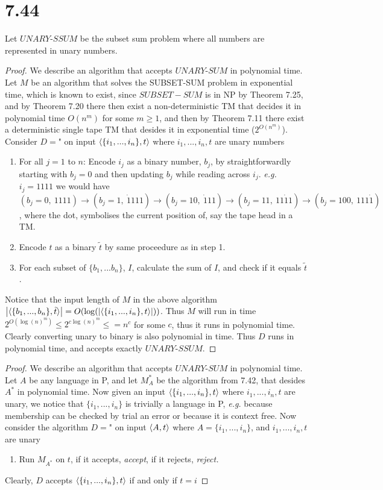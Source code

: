 \documentclass[a4paper,11pt]{article}
\newcommand{\abs}[1]{\left\lvert #1 \right\rvert}
\newcommand{\eg}{\emph{e.g.} }
\numberwithin{equation}{section}
\begin{document}
\section*{7.44}
Let $ UNARY\text{-}SSUM $ be the subset sum problem where all numbers are represented in unary numbers.
\begin{proof}
	We describe an algorithm that accepts $ UNARY\text{-}SUM $ in polynomial time. Let $ M $ be an algorithm that solves the SUBSET-SUM problem in exponential time, which is known to exist, since $ SUBSET-SUM $ is in NP  by Theorem 7.25, and by Theorem 7.20 there then exist a non-deterministic TM that decides it in polynomial time $ O(n^m) $ for some $ m\geq 1 $, and then by Theorem 7.11 there exist a deterministic single tape TM that desides it in exponential time ($ 2^{O(n^m)} $). Consider $ D= $" on input $ \braket{\{i_1,...,i_n\},t} $ where $ i_1,...,i_n,t $ are unary numbers\begin{enumerate}
		\item For all $ j=1 $ to $ n $: Encode $ i_j $ as a binary number, $ b_j $, by straightforwardly starting with $ b_j=0 $ and then updating $ b_j $ while reading across $ i_j $. \eg $ i_j=1111 $ we would have $(b_j=0,\ 1111)\to (b_j=1,\ \dot{1}111)\to (b_j=10,\ \dot{1}11)\to (b_j=11,\ 11\dot{1}1)\to (b_j=100,\ 111\dot{1}) $, where the dot, symbolises the current position of, say the tape head in a TM. 
		\item Encode $ t $ as a binary $ \tilde{t} $ by same proceedure as in step 1. 
		\item For each subset of $ \{b_1,...b_n\} $, $ I $, calculate the sum of $ I $, and check if it equals $ \tilde{t} $.
	\end{enumerate}
	Notice that the input length of $ M $ in the above algorithm $ \abs{\braket{\{b_1,...,b_n\},\tilde{t}}}=O(\log(\abs{\braket{\{i_1,...,i_n\},t}})) $. Thus $ M $ will run in time $ 2^{O(\log(n)^m)}\leq2^{c\log(n)^m}\leq=n^c $ for some $ c $, thus it runs in polynomial time. Clearly converting unary to binary is also polynomial in time. Thus $ D $ runs in polynomial time, and accepts exactly $ UNARY\text{-}SSUM $. 
\end{proof}
\begin{proof}
	We describe an algorithm that accepts $ UNARY\text{-}SUM $ in polynomial time. Let $ A $ be any language in P, and let $ M_A^* $ be the algorithm from 7.42, that desides $  A^*  $ in polynomial time. Now given an input $ \braket{\{i_1,...,i_n\},t} $ where $ i_1,...,i_n,t $ are unary, we notice that $ \{i_1,...,i_n\} $ is trivially a language in P, \eg because membership can be checked by trial an error or because it is context free. Now consider the algorithm $ D= $" on input $ \braket{A,t} $ where $A=\{i_1,...,i_n\}$, and $ i_1,...,i_n,t $ are unary\begin{enumerate}
		\item Run $ M_{A^*} $ on $ t $, if it accepts, \emph{accept}, if it rejects, \emph{reject.}
	\end{enumerate}
	Clearly, $ D $ accepts $ \braket{\{i_1,...,i_n\},t} $ if and only if $ t=i $
\end{proof}
\end{document}
